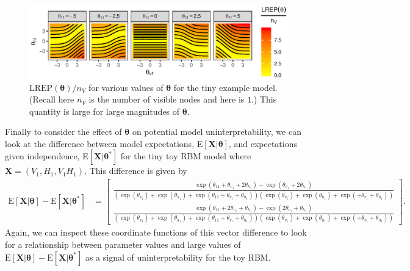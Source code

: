 \documentclass[]{article}
\theoremstyle{definition}
\newcommand{\nv}{{n_{\scriptscriptstyle V}}}
\begin{document}
\par
\begin{figure}

{\centering \includegraphics{paper_files/figure-latex/instab-1} 

}

\caption{$\text{LREP}(\boldsymbol \theta)/\nv$ for various values of $\boldsymbol \theta$ for the tiny example model. (Recall here $\nv$ is the number of visible nodes and here is $1$.) This quantity is large for large magnitudes of $\boldsymbol \theta$.}\label{fig:instab}
\end{figure}
Finally to consider the effect of \(\boldsymbol \theta\) on potential
model uninterpretability, we can look at the difference between model
expectations, E\(\left[\boldsymbol X | \boldsymbol \theta\right]\), and
expectations given independence,
E\(\left[\boldsymbol X | \boldsymbol \theta^*\right ]\) for the tiny toy
RBM model where \(\boldsymbol X = (V_1, H_1, V_1 H_1)\). This difference
is given by \begin{align*}
\text{E}\left[\boldsymbol X | \boldsymbol \theta\right] -   \text{E}\left[\boldsymbol X | \boldsymbol \theta^* \right] 
&= \left[
\begin{matrix}
\frac{\exp\left(\theta_{11} + \theta_{v_1} + 2\theta_{h_1}\right) - \exp\left( \theta_{v_1} + 2\theta_{h_1}\right) }{\left(\exp\left(\theta_{v_1}\right) + \exp\left(\theta_{h_1}\right) + \exp\left(\theta_{11} + \theta_{v_1} + \theta_{h_1}\right)\right)\left(\exp\left(\theta_{v_1}\right) + \exp\left(\theta_{h_1}\right) + \exp\left(+ \theta_{v_1} + \theta_{h_1}\right)\right)} \\
\frac{\exp\left(\theta_{11} + 2\theta_{v_1} + \theta_{h_1}\right) - \exp\left( 2\theta_{v_1} + \theta_{h_1}\right)  }{\left(\exp\left(\theta_{v_1}\right) + \exp\left(\theta_{h_1}\right) + \exp\left(\theta_{11} + \theta_{v_1} + \theta_{h_1}\right)\right)\left(\exp\left(\theta_{v_1}\right) + \exp\left(\theta_{h_1}\right) + \exp\left(+ \theta_{v_1} + \theta_{h_1}\right)\right)}
\end{matrix}\right].
\end{align*}
Again, we can inspect these coordinate functions of this vector
difference to look for a relationship between parameter values and large
values of
\(\text{E}[\boldsymbol X|\boldsymbol \theta] - \text{E}[\boldsymbol X| \boldsymbol \theta^*]\)
as a signal of uninterpretability for the toy RBM.
\end{document}
